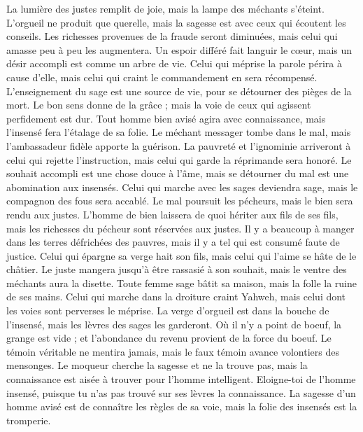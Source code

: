 \begin{multicols}{2}
La lumière des justes remplit de joie, mais la lampe des méchants s'éteint.
L'orgueil ne produit que querelle, mais la sagesse est avec ceux qui écoutent les conseils.
Les richesses provenues de la fraude seront diminuées, mais celui qui amasse peu à peu les augmentera.
Un espoir différé fait languir le cœur, mais un désir accompli est comme un arbre de vie.
Celui qui méprise la parole périra à cause d'elle, mais celui qui craint le commandement en sera récompensé.
L'enseignement du sage est une source de vie, pour se détourner des pièges de la mort.
Le bon sens donne de la grâce ; mais la voie de ceux qui agissent perfidement est dur.
Tout homme bien avisé agira avec connaissance, mais l'insensé fera l'étalage de sa folie.
Le méchant messager tombe dans le mal, mais l'ambassadeur fidèle apporte la guérison.
La pauvreté et l'ignominie arriveront à celui qui rejette l'instruction, mais celui qui garde la réprimande sera honoré.
Le souhait accompli est une chose douce à l'âme, mais se détourner du mal est une abomination aux insensés.
Celui qui marche avec les sages deviendra sage, mais le compagnon des fous sera accablé.
Le mal poursuit les pécheurs, mais le bien sera rendu aux justes.
L'homme de bien laissera de quoi hériter aux fils de ses fils, mais les richesses du pécheur sont réservées aux justes.
Il y a beaucoup à manger dans les terres défrichées des pauvres, mais il y a tel qui est consumé faute de justice.
Celui qui épargne sa verge hait son fils, mais celui qui l'aime se hâte de le châtier.
Le juste mangera jusqu'à être rassasié à son souhait, mais le ventre des méchants aura la disette.
\VerseOne{}Toute femme sage bâtit sa maison, mais la folle la ruine de ses mains.
Celui qui marche dans la droiture craint Yahweh, mais celui dont les voies sont perverses le méprise.
La verge d'orgueil est dans la bouche de l'insensé, mais les lèvres des sages les garderont.
Où il n'y a point de boeuf, la grange est vide ; et l'abondance du revenu provient de la force du boeuf.
Le témoin véritable ne mentira jamais, mais le faux témoin avance volontiers des mensonges.
Le moqueur cherche la sagesse et ne la trouve pas, mais la connaissance est aisée à trouver pour l'homme intelligent.
Eloigne-toi de l'homme insensé, puisque tu n'as pas trouvé sur ses lèvres la connaissance.
La sagesse d'un homme avisé est de connaître les règles de sa voie, mais la folie des insensés est la tromperie.

\end{multicols}
